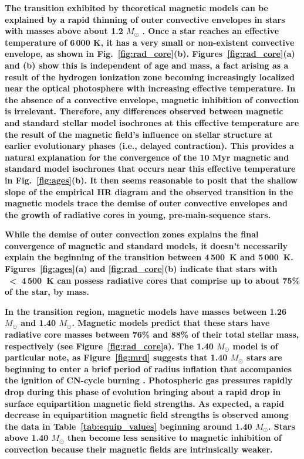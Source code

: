 \documentclass{aa}
\begin{document}
{\bf The transition exhibited by theoretical magnetic models can be explained by a rapid thinning of outer convective envelopes in stars with masses above about 1.2 $M_{\odot}$ \citep[e.g.,][]{Iben1965}. Once a star reaches an effective temperature of 6\,000 K, it has a very small or non-existent convective envelope, as shown in Fig.~\ref{fig:rad_core}(b). Figures~\ref{fig:rad_core}(a) and (b) show this is independent of age and mass, a fact arising as a result of the hydrogen ionization zone becoming increasingly localized near the optical photosphere with increasing effective temperature. In the absence of a convective envelope, magnetic inhibition of convection is irrelevant. Therefore, any differences observed between magnetic and standard stellar model isochrones at this effective temperature are the result of the magnetic field's influence on stellar structure at earlier evolutionary phases (i.e., delayed contraction). This provides a natural explanation for the convergence of the 10 Myr magnetic and standard model isochrones that occurs near this effective temperature in Fig.~\ref{fig:ages}(b). 
It then seems reasonable to posit that the shallow slope of the empirical HR diagram and the observed transition in the magnetic models trace the demise of outer convective envelopes and the growth of radiative cores in young, pre-main-sequence stars.}

{\bf While the demise of outer convection zones explains the final convergence of magnetic and standard models, it doesn't necessarily explain the beginning of the transition between  4\,500~K and 5\,000~K. Figures~\ref{fig:ages}(a) and \ref{fig:rad_core}(b) indicate that stars with \teff~<~4\,500~K can possess radiative cores that comprise up to about 75\% of the star, by mass.}
 
{\bf In the transition region, magnetic models have masses between 1.26 $M_{\odot}$ and 1.40 $M_{\odot}$. Magnetic models predict that these stars have radiative core masses between 76\% and 88\% of their total stellar mass, respectively (see Figure~\ref{fig:rad_core}a). The 1.40 $M_{\odot}$ model is of particular note, as Figure~\ref{fig:mrd} suggests that 1.40 $M_{\odot}$ stars are beginning to enter a brief period of radius inflation that accompanies the ignition of CN-cycle burning \citep{Iben1965}. Photospheric gas pressures rapidly drop during this phase of evolution bringing about a rapid drop in surface equipartition magnetic field strengths. As expected, a rapid decrease in equipartition magnetic field strengths is observed among the data in Table~\ref{tab:equip_values} beginning around 1.40 $M_{\odot}$. Stars above 1.40 $M_{\odot}$ then become less sensitive to magnetic inhibition of convection because their magnetic fields are intrinsically weaker.}
\end{document}
